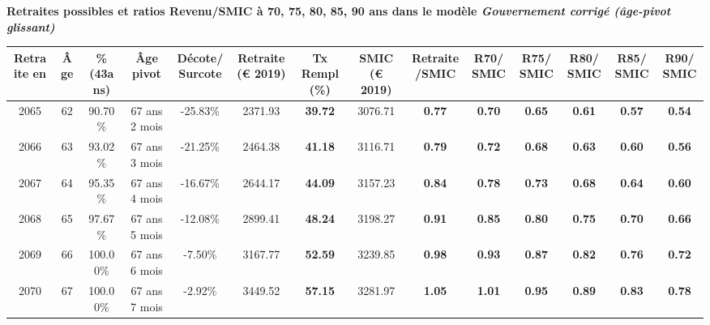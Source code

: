  \vspace{0.1cm} 
{\bf \noindent Retraites possibles et ratios Revenu/SMIC à 70, 75, 80, 85, 90 ans dans le modèle \emph{Gouvernement corrigé (âge-pivot glissant)}}  
 
\begin{adjustbox}{max width=\textwidth} 
\begin{tabular}[htb]{|c|c||c|c|c||c|c||c|c||c|c|c|c|c|} 
\hline 
 Retraite en &  Âge &  \%(43ans) &  Âge pivot &  Décote/Surcote &  Retraite (\euro{} 2019) &  Tx Rempl(\%) &  SMIC (\euro{} 2019) &  Retraite/SMIC &  R70/SMIC &  R75/SMIC &  R80/SMIC &  R85/SMIC &  R90/SMIC \\ 
\hline \hline 
 2065 &  62 &  90.70\% &  67 ans 2 mois &  -25.83\% &  2371.93 &  {\bf 39.72} &  3076.71 &  {\bf {\color{red} 0.77}} &  {\bf {\color{red} 0.70}} &  {\bf {\color{red} 0.65}} &  {\bf {\color{red} 0.61}} &  {\bf {\color{red} 0.57}} &  {\bf {\color{red} 0.54}} \\ 
\hline 
 2066 &  63 &  93.02\% &  67 ans 3 mois &  -21.25\% &  2464.38 &  {\bf 41.18} &  3116.71 &  {\bf {\color{red} 0.79}} &  {\bf {\color{red} 0.72}} &  {\bf {\color{red} 0.68}} &  {\bf {\color{red} 0.63}} &  {\bf {\color{red} 0.60}} &  {\bf {\color{red} 0.56}} \\ 
\hline 
 2067 &  64 &  95.35\% &  67 ans 4 mois &  -16.67\% &  2644.17 &  {\bf 44.09} &  3157.23 &  {\bf {\color{red} 0.84}} &  {\bf {\color{red} 0.78}} &  {\bf {\color{red} 0.73}} &  {\bf {\color{red} 0.68}} &  {\bf {\color{red} 0.64}} &  {\bf {\color{red} 0.60}} \\ 
\hline 
 2068 &  65 &  97.67\% &  67 ans 5 mois &  -12.08\% &  2899.41 &  {\bf 48.24} &  3198.27 &  {\bf {\color{red} 0.91}} &  {\bf {\color{red} 0.85}} &  {\bf {\color{red} 0.80}} &  {\bf {\color{red} 0.75}} &  {\bf {\color{red} 0.70}} &  {\bf {\color{red} 0.66}} \\ 
\hline 
 2069 &  66 &  100.00\% &  67 ans 6 mois &  -7.50\% &  3167.77 &  {\bf 52.59} &  3239.85 &  {\bf {\color{red} 0.98}} &  {\bf {\color{red} 0.93}} &  {\bf {\color{red} 0.87}} &  {\bf {\color{red} 0.82}} &  {\bf {\color{red} 0.76}} &  {\bf {\color{red} 0.72}} \\ 
\hline 
 2070 &  67 &  100.00\% &  67 ans 7 mois &  -2.92\% &  3449.52 &  {\bf 57.15} &  3281.97 &  {\bf 1.05} &  {\bf 1.01} &  {\bf {\color{red} 0.95}} &  {\bf {\color{red} 0.89}} &  {\bf {\color{red} 0.83}} &  {\bf {\color{red} 0.78}} \\ 
\hline 
\hline 
\end{tabular} 
\end{adjustbox} 
 
